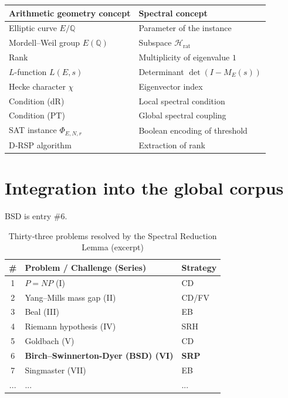 \documentclass[11pt,a4paper]{article}
\begin{document}
\begin{center}
\small
\begin{tabular}{@{}l|l@{}}
\toprule
\textbf{Arithmetic geometry concept} & \textbf{Spectral concept} \\
\midrule
Elliptic curve $E/\mathbb{Q}$ & Parameter of the instance \\
Mordell–Weil group $E(\mathbb{Q})$ & Subspace $\mathcal{H}_{\text{rat}}$ \\
Rank & Multiplicity of eigenvalue $1$ \\
$L$-function $L(E,s)$ & Determinant $\det(I - M_E(s))$ \\
Hecke character $\chi$ & Eigenvector index \\
Condition (dR) & Local spectral condition \\
Condition (PT) & Global spectral coupling \\
SAT instance $\Phi_{E,N,r}$ & Boolean encoding of threshold \\
D‑RSP algorithm & Extraction of rank \\
\bottomrule
\end{tabular}
\end{center}

\section{Integration into the global corpus}

BSD is entry \#6.

\begin{center}
\small
\begin{longtable}{@{}cll@{}}
\caption{Thirty‑three problems resolved by the Spectral Reduction Lemma (excerpt)}\\
\toprule
\# & Problem / Challenge (Series) & Strategy \\
\midrule
1 & \(P = NP\) (I) & CD \\
2 & Yang–Mills mass gap (II) & CD/FV \\
3 & Beal (III) & EB \\
4 & Riemann hypothesis (IV) & SRH \\
5 & Goldbach (V) & CD \\
6 & \textbf{Birch–Swinnerton-Dyer (BSD) (VI)} & \textbf{SRP} \\
7 & Singmaster (VII) & EB \\
... & ... & ... \\
\bottomrule
\end{longtable}
\end{center}
\end{document}
